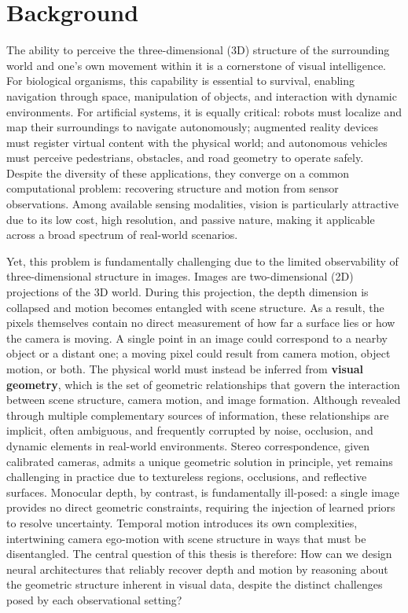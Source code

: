 \section{Background}
The ability to perceive the three-dimensional (3D) structure of the surrounding world and one's own movement within it is a cornerstone of visual intelligence.
For biological organisms, this capability is essential to survival, enabling navigation through space, manipulation of objects, and interaction with dynamic environments.
For artificial systems, it is equally critical: robots must localize and map their surroundings to navigate autonomously; augmented reality devices must register virtual content with the physical world; and autonomous vehicles must perceive pedestrians, obstacles, and road geometry to operate safely.
Despite the diversity of these applications, they converge on a common computational problem: recovering structure and motion from sensor observations.
Among available sensing modalities, vision is particularly attractive due to its low cost, high resolution, and passive nature, making it applicable across a broad spectrum of real-world scenarios.

Yet, this problem is fundamentally challenging due to the limited observability of three-dimensional structure in images.
Images are two-dimensional (2D) projections of the 3D world.
During this projection, the depth dimension is collapsed and motion becomes entangled with scene structure.
As a result, the pixels themselves contain no direct measurement of how far a surface lies or how the camera is moving.
A single point in an image could correspond to a nearby object or a distant one; a moving pixel could result from camera motion, object motion, or both.
The physical world must instead be inferred from \textbf{visual geometry}, which is the set of geometric relationships that govern the interaction between scene structure, camera motion, and image formation.
Although revealed through multiple complementary sources of information, these relationships are implicit, often ambiguous, and frequently corrupted by noise, occlusion, and dynamic elements in real-world environments.
Stereo correspondence, given calibrated cameras, admits a unique geometric solution in principle, yet remains challenging in practice due to textureless regions, occlusions, and reflective surfaces.
Monocular depth, by contrast, is fundamentally ill-posed: a single image provides no direct geometric constraints, requiring the injection of learned priors to resolve uncertainty.
Temporal motion introduces its own complexities, intertwining camera ego-motion with scene structure in ways that must be disentangled.
The central question of this thesis is therefore: How can we design neural architectures that reliably recover depth and motion by reasoning about the geometric structure inherent in visual data, despite the distinct challenges posed by each observational setting?

